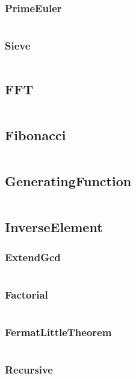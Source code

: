 \documentclass[a4paper,11pt]{article}
\begin{document}
\subsubsection{PrimeEuler}
\inputminted[breaklines]{c++}{M/我的模板/02++Math/+Euler/+PrimeEuler.cpp}
\subsubsection{Sieve}
\inputminted[breaklines]{c++}{M/我的模板/02++Math/+Euler/+Sieve.cpp}

\subsection{FFT}
\inputminted[breaklines]{c++}{M/我的模板/02++Math/+FFT.cpp}
\subsection{Fibonacci}
\inputminted[breaklines]{c++}{M/我的模板/02++Math/+Fibonacci.cpp}
\subsection{GeneratingFunction}
\inputminted[breaklines]{c++}{M/我的模板/02++Math/+GeneratingFunction.cpp}
\subsection{InverseElement}
\subsubsection{ExtendGcd}
\inputminted[breaklines]{c++}{M/我的模板/02++Math/+InverseElement/+ExtendGcd.cpp}
\subsubsection{Factorial}
\inputminted[breaklines]{c++}{M/我的模板/02++Math/+InverseElement/+Factorial.cpp}
\subsubsection{FermatLittleTheorem}
\inputminted[breaklines]{c++}{M/我的模板/02++Math/+InverseElement/+FermatLittleTheorem.cpp}
\subsubsection{Recursive}
\inputminted[breaklines]{c++}{M/我的模板/02++Math/+InverseElement/+Recursive.cpp}
\end{document}

